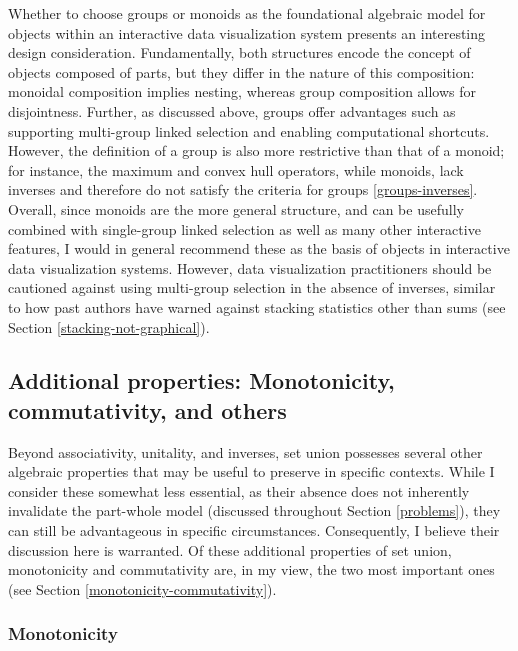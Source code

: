 \documentclass[
  openany]{book}
\theoremstyle{definition}
\theoremstyle{definition}
\theoremstyle{definition}
\theoremstyle{definition}
\theoremstyle{remark}
\begin{document}
Whether to choose groups or monoids as the foundational algebraic model for objects within an interactive data visualization system presents an interesting design consideration. Fundamentally, both structures encode the concept of objects composed of parts, but they differ in the nature of this composition: monoidal composition implies nesting, whereas group composition allows for disjointness. Further, as discussed above, groups offer advantages such as supporting multi-group linked selection and enabling computational shortcuts. However, the definition of a group is also more restrictive than that of a monoid; for instance, the maximum and convex hull operators, while monoids, lack inverses and therefore do not satisfy the criteria for groups \ref{groups-inverses}. Overall, since monoids are the more general structure, and can be usefully combined with single-group linked selection as well as many other interactive features, I would in general recommend these as the basis of objects in interactive data visualization systems. However, data visualization practitioners should be cautioned against using multi-group selection in the absence of inverses, similar to how past authors have warned against stacking statistics other than sums (see Section \ref{stacking-not-graphical}).

\subsection{Additional properties: Monotonicity, commutativity, and others}\label{additional-properties-monotonicity-commutativity-and-others}

Beyond associativity, unitality, and inverses, set union possesses several other algebraic properties that may be useful to preserve in specific contexts. While I consider these somewhat less essential, as their absence does not inherently invalidate the part-whole model (discussed throughout Section \ref{problems}), they can still be advantageous in specific circumstances. Consequently, I believe their discussion here is warranted. Of these additional properties of set union, monotonicity and commutativity are, in my view, the two most important ones (see Section \ref{monotonicity-commutativity}).

\subsubsection{Monotonicity}\label{monotonicity-1}
\end{document}

